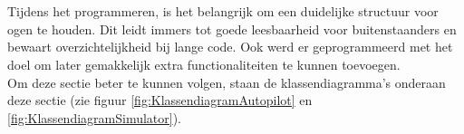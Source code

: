 \\
\\
Tijdens het programmeren, is het belangrijk om een duidelijke structuur voor ogen te houden. Dit leidt immers tot goede leesbaarheid voor buitenstaanders en bewaart overzichtelijkheid bij lange code. Ook werd er geprogrammeerd met het doel om later gemakkelijk extra functionaliteiten te kunnen toevoegen.
\\
Om deze sectie beter te kunnen volgen, staan de klassendiagramma's onderaan deze sectie (zie figuur \ref{fig:KlassendiagramAutopilot} en \ref{fig:KlassendiagramSimulator}).

